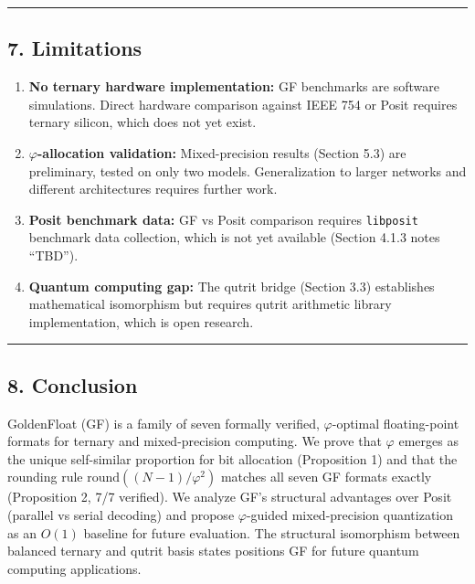 \begin{center}\rule{0.5\linewidth}{0.5pt}\end{center}

\subsection{7. Limitations}\label{limitations}

\begin{enumerate}
\def\labelenumi{\arabic{enumi}.}
\item
  \textbf{No ternary hardware implementation:} GF benchmarks are
  software simulations. Direct hardware comparison against IEEE 754 or
  Posit requires ternary silicon, which does not yet exist.
\item
  \textbf{\(\varphi\)-allocation validation:} Mixed-precision results
  (Section 5.3) are preliminary, tested on only two models.
  Generalization to larger networks and different architectures requires
  further work.
\item
  \textbf{Posit benchmark data:} GF vs Posit comparison requires
  \texttt{libposit} benchmark data collection, which is not yet
  available (Section 4.1.3 notes ``TBD'').
\item
  \textbf{Quantum computing gap:} The qutrit bridge (Section 3.3)
  establishes mathematical isomorphism but requires qutrit arithmetic
  library implementation, which is open research.
\end{enumerate}

\begin{center}\rule{0.5\linewidth}{0.5pt}\end{center}

\subsection{8. Conclusion}\label{conclusion}

GoldenFloat (GF) is a family of seven formally verified,
\(\varphi\)-optimal floating-point formats for ternary and
mixed-precision computing. We prove that \(\varphi\) emerges as the
unique self-similar proportion for bit allocation (Proposition 1) and
that the rounding rule \(\text{round}((N-1)/\varphi^2)\) matches all
seven GF formats exactly (Proposition 2, 7/7 verified). We analyze GF's
structural advantages over Posit (parallel vs serial decoding) and
propose \(\varphi\)-guided mixed-precision quantization as an \(O(1)\)
baseline for future evaluation. The structural isomorphism between
balanced ternary and qutrit basis states positions GF for future quantum
computing applications.


